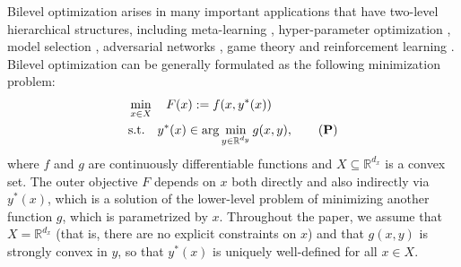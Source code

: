 
Bilevel optimization \cite{colson2007overview} arises in many important applications that have two-level hierarchical structures, including meta-learning \cite{rajeswaran2019meta}, hyper-parameter optimization \cite{franceschi2018bilevel, bao2021stability}, model selection \cite{kunapuli2008bilevel, giovannelli2021bilevel}, adversarial networks \cite{goodfellow2020generative, gidel2018variational}, game theory \cite{stackelberg1952theory} and reinforcement learning \cite{konda1999actor, sutton2018reinforcement}. Bilevel optimization can be generally formulated as the following minimization problem:
\begin{align}
    &\min_{x \in X} \quad F(x) := f(x,y^*(x)) \nonumber \\
    &\text{s.t.} \quad y^*(x) \in \arg \min_{y \in \mathbb{R}^{d_y}} g(x,y), \label{problem:bilevel} \tag{\textbf{P}}
\end{align}
where $f$ and $g$ are continuously differentiable functions and $X \subseteq \mathbb{R}^{d_x}$ is a convex set. 
The outer objective $F$ depends on $x$ both directly and also indirectly via $y^*(x)$, which is a solution of the  lower-level problem of minimizing another function $g$, which is parametrized by $x$. 
Throughout the paper, we assume that $X = \mathbb{R}^{d_x}$ (that is, there are no explicit constraints on $x$) and  that $g(x,y)$ is strongly convex in $y$, so that $y^*(x)$ is uniquely well-defined for all $x \in X$. 


